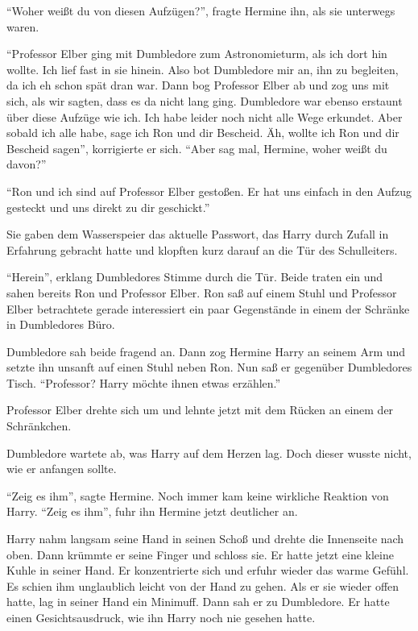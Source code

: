 \enquote{Woher weißt du von diesen Aufzügen?}, fragte Hermine ihn, als sie unterwegs waren.

\enquote{Professor Elber ging mit Dumbledore zum Astronomieturm, als ich dort hin wollte. Ich lief fast in sie hinein. Also bot Dumbledore mir an, ihn zu begleiten, da ich eh schon spät dran war. Dann bog Professor Elber ab und zog uns mit sich, als wir sagten, dass es da nicht lang ging. Dumbledore war ebenso erstaunt über diese Aufzüge wie ich. Ich habe leider noch nicht alle Wege erkundet. Aber sobald ich alle habe, sage ich Ron und dir Bescheid. \gst Äh, wollte ich Ron und dir Bescheid sagen}, korrigierte er sich. \enquote{Aber sag mal, Hermine, woher weißt du davon?}

\enquote{Ron und ich sind auf Professor Elber gestoßen. Er hat uns einfach in den Aufzug gesteckt und uns direkt zu dir geschickt.}

Sie gaben dem Wasserspeier das aktuelle Passwort, das Harry durch Zufall in Erfahrung gebracht hatte und klopften kurz darauf an die Tür des Schulleiters.

\enquote{Herein}, erklang Dumbledores Stimme durch die Tür. Beide traten ein und sahen bereits Ron und Professor Elber. Ron saß auf einem Stuhl und Professor Elber betrachtete gerade interessiert ein paar Gegenstände in einem der Schränke in Dumbledores Büro.

Dumbledore sah beide fragend an. Dann zog Hermine Harry an seinem Arm und setzte ihn unsanft auf einen Stuhl neben Ron. Nun saß er gegenüber Dumbledores Tisch. \enquote{Professor? Harry möchte ihnen etwas erzählen.}

Professor Elber drehte sich um und lehnte jetzt mit dem Rücken an einem der Schränkchen.

Dumbledore wartete ab, was Harry auf dem Herzen lag. Doch dieser wusste nicht, wie er anfangen sollte.

\enquote{Zeig es ihm}, sagte Hermine. Noch immer kam keine wirkliche Reaktion von Harry. \enquote{Zeig es ihm}, fuhr ihn Hermine jetzt deutlicher an.

Harry nahm langsam seine Hand in seinen Schoß und drehte die Innenseite nach oben. Dann krümmte er seine Finger und schloss sie. Er hatte jetzt eine kleine Kuhle in seiner Hand. Er konzentrierte sich und erfuhr wieder das warme Gefühl. Es schien ihm unglaublich leicht von der Hand zu gehen. Als er sie wieder offen hatte, lag in seiner Hand ein Minimuff. Dann sah er zu Dumbledore. Er hatte einen Gesichtsausdruck, wie ihn Harry noch nie gesehen hatte.

